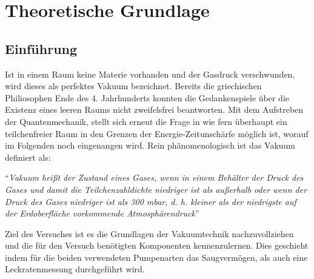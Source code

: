 \section{Theoretische Grundlage}
\label{sec:Theorie}

\subsection{Einführung}
Ist in einem Raum keine Materie vorhanden und der Gasdruck verschwunden, wird dieses als perfektes Vakuum bezeichnet. Bereits die griechischen Philiosophen Ende des 4. Jahrhunderts konnten die Gedankenspiele über die Existenz eines leeren Raums nicht zweifelsfrei beantworten. Mit dem Aufstreben der Quantenmechanik, stellt sich erneut die Frage in wie fern überhaupt ein teilchenfreier Raum in den Grenzen der Energie-Zeitunschärfe möglich ist, worauf im Folgenden noch eingenangen wird. Rein phänomenologisch ist das Vakuum definiert als:

``\textit{Vakuum heißt der Zustand eines Gases, wenn in einem Behälter der Druck des Gases und damit die Teilchenzahldichte niedriger ist als außerhalb oder wenn der Druck des Gases niedriger ist als 300 mbar, d. h. kleiner als der niedrigste auf der Erdoberfläche vorkommende Atmosphärendruck}'' \cite{DIN}

Ziel des Versuches ist es die Grundlagen der Vakuumtechnik nachzuvollziehen und die für den Versuch benötigten Komponenten kennenzulernen. Dies geschieht indem für die beiden verwendeten Pumpenarten das Saugvermögen, als auch eine Leckratenmessung durchgeführt wird.

